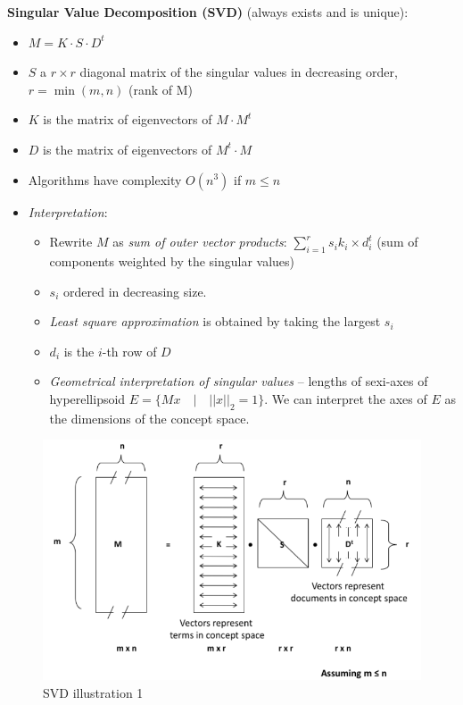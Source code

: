     \textbf{Singular Value Decomposition (SVD)} (always exists and is unique):
    \begin{itemize}
      \item $M = K\cdot S\cdot D^t$
      \item $S$ a $r\times r$ diagonal matrix of the singular values in decreasing order, $r=\min{(m,n)}$ (rank of M)
      \item $K$ is the matrix of eigenvectors of $M\cdot M^t$
      \item $D$ is the matrix of eigenvectors of $M^t\cdot M$
      \item Algorithms have complexity $O(n^3)$ if $m\leq n$
      \item \emph{Interpretation}:
      \begin{itemize}
        \item Rewrite $M$ as \emph{sum of outer vector products}: $\sum_{i=1}^{r}{s_i k_i \times d_i^t}$ (sum of components weighted by the singular values)
        \item $s_i$ ordered in decreasing size.
        \item \emph{Least square approximation} is obtained by taking the largest $s_i$
        \item $d_i$ is the $i$-th row of $D$
        \item \emph{Geometrical interpretation of singular values} -- lengths of sexi-axes of hyperellipsoid $E=\{Mx\quad |\quad  ||x||_2=1\}$. We can interpret the axes of $E$ as the dimensions of the concept space.
      \end{itemize}
    \end{itemize}

    \begin{figure}[htp]
      \centering
        \includegraphics[width=.7\textwidth]{images/SVD1.png}
        \caption{SVD illustration 1}
        \label{fig:svd1}
    \end{figure}

